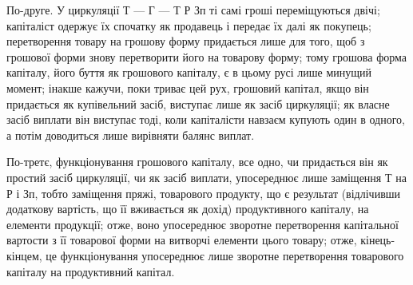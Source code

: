 По-друге. У циркуляції Т — Г — Т Р Зп ті самі гроші переміщуються двічі; капіталіст одержує їх
спочатку як продавець і передає їх далі як покупець;
перетворення товару на грошову форму придається лише для того,
щоб з грошової форми знову перетворити його на товарову форму;
тому грошова форма капіталу, його буття як грошового капіталу,
є в цьому русі лише минущий момент; інакше кажучи, поки триває цей
рух, грошовий капітал, якщо він придається як купівельний засіб, виступає
лише як засіб циркуляції; як власне засіб виплати він виступає тоді,
коли капіталісти навзаєм купують один в одного, а потім доводиться
лише вирівняти балянс виплат.

По-третє, функціонування грошового капіталу, все одно, чи придається
він як простий засіб циркуляції, чи як засіб виплати, упосереднює лише
заміщення Т на Р і Зп, тобто заміщення пряжі, товарового продукту,
що є результат (відлічивши додаткову вартість, що її вживається як дохід)
продуктивного капіталу, на елементи продукції; отже, воно упосереднює
зворотне перетворення капітальної вартости з її товарової форми на
витворчі елементи цього товару; отже, кінець-кінцем, це функціонування
упосереднює лише зворотне перетворення товарового капіталу на продуктивний
капітал.
